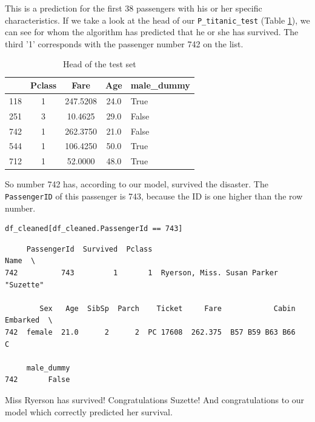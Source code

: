 \documentclass[11pt]{article}
\begin{document}
This is a prediction for the first 38 passengers with his or her specific characteristics. If we take a look at the head of our \texttt{P\_titanic\_test} (Table \ref{tab:tableptest}), we can see for whom the algorithm has predicted that he or she has survived. The third '1' corresponds with the passenger number 742 on the list. 

\begin{table}
\small
\begin{center}
\caption{\label{tab:tableptest}Head of the test set}
\begin{tabular}{|l|c|c|c|l|}
\toprule
\hline
{} &  Pclass &      Fare &   Age &  male\_dummy \\
\midrule
\hline
118 &       1 &  247.5208 &  24.0 &        True \\
251 &       3 &   10.4625 &  29.0 &       False \\
742 &       1 &  262.3750 &  21.0 &       False \\
544 &       1 &  106.4250 &  50.0 &        True \\
712 &       1 &   52.0000 &  48.0 &        True \\
\bottomrule
\hline
\end{tabular}
\end{center}
\end{table}

So number 742 has, according to our model, survived the disaster. The \texttt{PassengerID} of this passenger is 743, because the ID is one higher than the row number. 

\begin{verbatim}
df_cleaned[df_cleaned.PassengerId == 743]
\end{verbatim}

\begin{verbatim}
     PassengerId  Survived  Pclass                                   Name  \
742          743         1       1  Ryerson, Miss. Susan Parker "Suzette"   

        Sex   Age  SibSp  Parch    Ticket     Fare            Cabin Embarked  \
742  female  21.0      2      2  PC 17608  262.375  B57 B59 B63 B66        C   

     male_dummy  
742       False  
\end{verbatim}

Miss Ryerson has survived! Congratulations Suzette! And congratulations to our model which correctly predicted her survival. 
\end{document}
